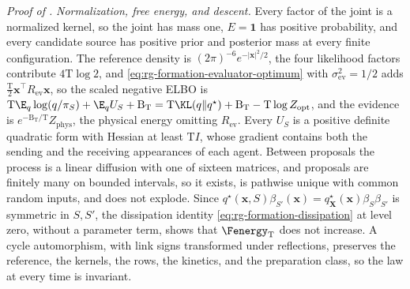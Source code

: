 \noindent\emph{Proof of .}
\emph{Normalization, free energy, and descent.} Every factor of the joint is a
normalized kernel, so the joint has mass one, \(E=\mathbf 1\) has positive
probability, and every candidate source has positive prior and posterior mass
at every finite configuration. The reference density is
\((2\pi)^{-6}e^{-|\mathbf x|^2/2}\), the four likelihood factors contribute
\(4\mathrm T\log2\), and \cref{eq:rg-formation-evaluator-optimum} with
\(\sigma^2_{\mathrm{ev}}=1/2\) adds
\(\tfrac{\mathrm T}2\mathbf x^\top R_{\mathrm{ev}}\mathbf x\), so the scaled
negative ELBO is
\(\mathrm T\E_q\log(q/\pi_S)+\E_qU_S+\mathrm B_{\mathrm T}
=\mathrm T\KL(q\Vert q^\star)+\mathrm B_{\mathrm T}-\mathrm T\log Z_{\mathrm{opt}}\),
and the evidence is \(e^{-\mathrm B_{\mathrm T}/\mathrm T}Z_{\mathrm{phys}}\),
the physical energy omitting \(R_{\mathrm{ev}}\). Every \(U_S\) is a positive
definite quadratic form with Hessian at least \(\mathrm TI\), whose gradient
contains both the sending and the receiving appearances of each agent.
Between proposals the process is a linear diffusion with one of sixteen
matrices, and proposals are finitely many on bounded intervals, so it exists,
is pathwise unique with common random inputs, and does not explode. Since
\(q^\star(\mathbf x,S)\beta_{S'}(\mathbf x)
=q^\star_{\mathbf X}(\mathbf x)\beta_S\beta_{S'}\) is symmetric in \(S,S'\), the
dissipation identity \cref{eq:rg-formation-dissipation} at level zero, without
a parameter term, shows that \(\Fenergy_{\mathrm T}\) does not increase. A cycle
automorphism, with link signs transformed under reflections, preserves the
reference, the kernels, the rows, the kinetics, and the preparation class, so
the law at every time is invariant.

